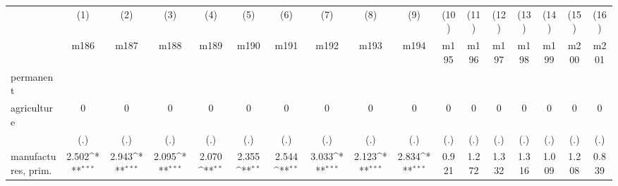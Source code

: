 {
\def\sym#1{\ifmmode^{#1}\else\(^{#1}\)\fi}
\begin{tabular}{l*{16}{c}}
\hline\hline
                    &\multicolumn{1}{c}{(1)}&\multicolumn{1}{c}{(2)}&\multicolumn{1}{c}{(3)}&\multicolumn{1}{c}{(4)}&\multicolumn{1}{c}{(5)}&\multicolumn{1}{c}{(6)}&\multicolumn{1}{c}{(7)}&\multicolumn{1}{c}{(8)}&\multicolumn{1}{c}{(9)}&\multicolumn{1}{c}{(10)}&\multicolumn{1}{c}{(11)}&\multicolumn{1}{c}{(12)}&\multicolumn{1}{c}{(13)}&\multicolumn{1}{c}{(14)}&\multicolumn{1}{c}{(15)}&\multicolumn{1}{c}{(16)}\\
                    &\multicolumn{1}{c}{m186}&\multicolumn{1}{c}{m187}&\multicolumn{1}{c}{m188}&\multicolumn{1}{c}{m189}&\multicolumn{1}{c}{m190}&\multicolumn{1}{c}{m191}&\multicolumn{1}{c}{m192}&\multicolumn{1}{c}{m193}&\multicolumn{1}{c}{m194}&\multicolumn{1}{c}{m195}&\multicolumn{1}{c}{m196}&\multicolumn{1}{c}{m197}&\multicolumn{1}{c}{m198}&\multicolumn{1}{c}{m199}&\multicolumn{1}{c}{m200}&\multicolumn{1}{c}{m201}\\
\hline
permanent           &                     &                     &                     &                     &                     &                     &                     &                     &                     &                     &                     &                     &                     &                     &                     &                     \\
agriculture         &           0         &           0         &           0         &           0         &           0         &           0         &           0         &           0         &           0         &           0         &           0         &           0         &           0         &           0         &           0         &           0         \\
                    &         (.)         &         (.)         &         (.)         &         (.)         &         (.)         &         (.)         &         (.)         &         (.)         &         (.)         &         (.)         &         (.)         &         (.)         &         (.)         &         (.)         &         (.)         &         (.)         \\
[1em]
manufactures, prim. &       2.502\sym{***}&       2.943\sym{***}&       2.095\sym{***}&       2.070\sym{**} &       2.355\sym{**} &       2.544\sym{**} &       3.033\sym{***}&       2.123\sym{***}&       2.834\sym{***}&       0.921         &       1.272         &       1.332         &       1.316         &       1.009         &       1.208         &       0.839         \\

\end{tabular}}
